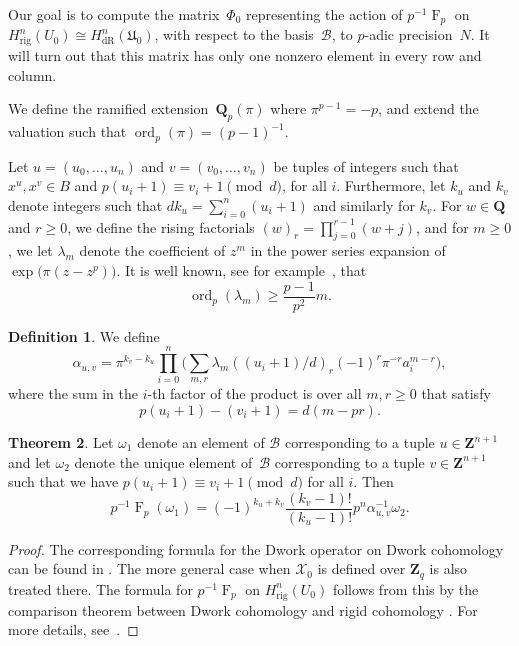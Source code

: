 \documentclass[a4paper,11pt]{article}
\numberwithin{equation}{section}
\newcommand{\ZZ}{\mathbf{Z}} %
\newcommand{\QQ}{\mathbf{Q}} %
\DeclareMathOperator{\ord}{ord}          %
\DeclareMathOperator{\Frob}{F}           %
\providecommand{\HdR}{H_{\text{dR}}}    %
\providecommand{\Hrig}{H_{\text{rig}}}  %
\providecommand{\cB}{\mathcal{B}} %
\theoremstyle{definition}
\newtheorem{thm}{Theorem}[section]
\newtheorem{defn}[thm]{Definition}
\begin{document}
Our goal is to compute 
the matrix~$\Phi_0$ representing the action of $p^{-1} \Frob_p$ on 
$\Hrig^n(U_0) \cong \HdR^n(\mathfrak{U}_0)$, with respect to the basis~$\cB$, 
to $p$-adic precision~$N$. It will turn out that this matrix has only one
nonzero element in every row and column.

We define the ramified extension~$\QQ_p(\pi)$ where $\pi^{p-1} = -p$, 
and extend the valuation such that \mbox{$\ord_p(\pi) = (p-1)^{-1}$}.

Let $u = (u_0, \dotsc, u_n)$ and $v = (v_0, \dotsc, v_n)$ be tuples 
of integers such that $x^u, x^v \in B$ and $p (u_i+1) \equiv v_i+1 \pmod{d}$,
for all $i$. Furthermore, let $k_u$ and $k_v$ denote integers such that 
$d k_u = \sum_{i=0}^n (u_i + 1)$ and similarly for $k_v$. For $w \in \QQ$ 
and $r \geq 0$, we define the rising factorials $(w)_r = \prod_{j=0}^{r-1} (w + j)$, 
and for $m \geq 0$, we let $\lambda_m$ denote the coefficient of $z^m$ in the 
power series expansion of $\exp \bigl( \pi (z - z^p) \bigr)$. It is well known, see 
for example~\citep{Dwork1962}, that 
\begin{equation} \label{eqn:dworkbound}
\ord_p(\lambda_m) \geq \frac{p-1}{p^2} m. 
\end{equation}

\begin{defn} We define \label{defn:alpha}
\[
\alpha_{u,v} = \pi^{k_v - k_u} \prod_{i = 0}^n \biggl( \sum_{m, r} \lambda_m ((u_i + 1) / d)_r (-1)^r \pi^{-r} a_i^{m-r} \biggr),
\]
where the sum in the $i$-th factor of the product is over all $m, r \geq 0$  
that satisfy
\[
p(u_i+1)-(v_i+1)=d(m-pr).
\]
\end{defn}

\begin{thm} \label{thm:01-03-diagfrob}
Let $\omega_1$ denote an element of $\cB$ corresponding to a tuple 
$u \in \ZZ^{n+1}$ and let $\omega_2$ denote the unique element of~$\cB$ 
corresponding to a tuple $v \in \ZZ^{n+1}$ such that
we have $p (u_i + 1) \equiv v_i + 1 \pmod{d}$ for all $i$. Then
\begin{equation*}
p^{-1} \Frob_p (\omega_1) = 
    (-1)^{k_u + k_v} \frac{(k_v - 1)!}{(k_u - 1)!} p^n \alpha_{u,v}^{-1} \omega_2.
\end{equation*}
\end{thm}

\begin{proof}
The corresponding formula for the Dwork operator on Dwork cohomology can
be found in %
\citep[\S 6.1]{Lauder2004b}. The more general case when $\mathcal{X}_0$ 
is defined over $\ZZ_q$ is also treated there. The formula for 
$p^{-1} \Frob_p$ on $\Hrig^n(U_0)$ follows from this by the comparison theorem 
between Dwork cohomology and rigid cohomology \citep[Theorem 1.12]{Katz}. 
For more details, see~\citep[Theorem 4.4]{Gerkmann2007}.
\end{proof}
\end{document}
